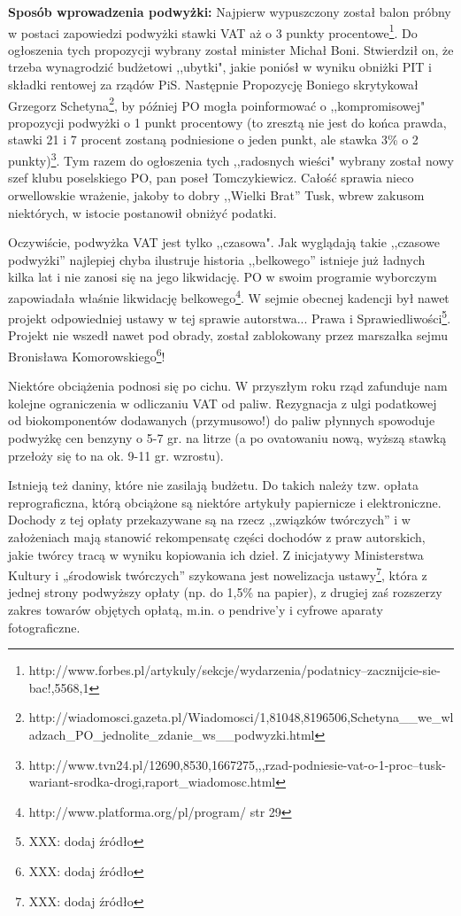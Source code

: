 \documentclass[10pt]{article}
\begin{document}
{\bf Sposób wprowadzenia podwyżki:} Najpierw wypuszczony został balon próbny w postaci zapowiedzi podwyżki stawki VAT aż o 3 punkty procentowe\footnote{http://www.forbes.pl/artykuly/sekcje/wydarzenia/podatnicy--zacznijcie-sie-bac!,5568,1}. Do ogłoszenia tych propozycji wybrany został minister Michał Boni. Stwierdził on, że trzeba wynagrodzić budżetowi ,,ubytki", jakie poniósł w wyniku obniżki PIT i składki rentowej za rządów PiS. Następnie Propozycję Boniego skrytykował Grzegorz Schetyna\footnote{http://wiadomosci.gazeta.pl/Wiadomosci/1,81048,8196506,Schetyna\_\_we\_wladzach\_PO\_jednolite\_zdanie\_ws\_\_podwyzki.html}, by później PO mogła poinformować o ,,kompromisowej" propozycji podwyżki o 1 punkt procentowy (to zresztą nie jest do końca prawda, stawki 21 i 7 procent zostaną podniesione o jeden punkt, ale stawka 3\% o 2 punkty)\footnote{http://www.tvn24.pl/12690,8530,1667275,,,rzad-podniesie-vat-o-1-proc--tusk-wariant-srodka-drogi,raport\_wiadomosc.html}. Tym razem do ogłoszenia tych ,,radosnych wieści" wybrany został nowy szef klubu poselskiego PO, pan poseł Tomczykiewicz. Całość sprawia nieco orwellowskie wrażenie, jakoby to dobry ,,Wielki Brat” Tusk, wbrew zakusom niektórych, w istocie postanowił obniżyć podatki.

Oczywiście, podwyżka VAT jest tylko ,,czasowa". Jak wyglądają takie ,,czasowe podwyżki” najlepiej chyba ilustruje historia ,,belkowego” istnieje już ładnych kilka lat i nie zanosi się na jego likwidację. PO w swoim programie wyborczym zapowiadała właśnie likwidację belkowego\footnote{http://www.platforma.org/pl/program/ str 29}. W sejmie obecnej kadencji był nawet projekt odpowiedniej ustawy w tej sprawie autorstwa... Prawa i Sprawiedliwości\footnote{XXX: dodaj źródło}. Projekt nie wszedł nawet pod obrady, został zablokowany przez marszałka sejmu Bronisława Komorowskiego\footnote{XXX: dodaj źródło}!

Niektóre obciążenia podnosi się po cichu. W przyszłym roku rząd zafunduje nam kolejne ograniczenia w odliczaniu VAT od paliw. Rezygnacja z ulgi podatkowej od biokomponentów dodawanych (przymusowo!) do paliw płynnych spowoduje podwyżkę cen benzyny o 5-7 gr. na litrze (a po ovatowaniu nową, wyższą stawką przełoży się to na ok. 9-11 gr. wzrostu).

Istnieją też daniny, które nie zasilają budżetu. Do takich należy tzw. opłata reprograficzna, którą obciążone są niektóre artykuły papiernicze i elektroniczne. Dochody z tej opłaty przekazywane są na rzecz ,,związków twórczych” i w założeniach mają stanowić rekompensatę części dochodów z praw autorskich, jakie twórcy tracą w wyniku kopiowania ich dzieł. Z inicjatywy Ministerstwa Kultury i „środowisk twórczych” szykowana jest nowelizacja ustawy\footnote{XXX: dodaj źródło}, która z jednej strony podwyższy opłaty (np. do 1,5\% na papier), z drugiej zaś rozszerzy zakres towarów objętych opłatą, m.in. o pendrive'y i cyfrowe aparaty fotograficzne.
\end{document}
